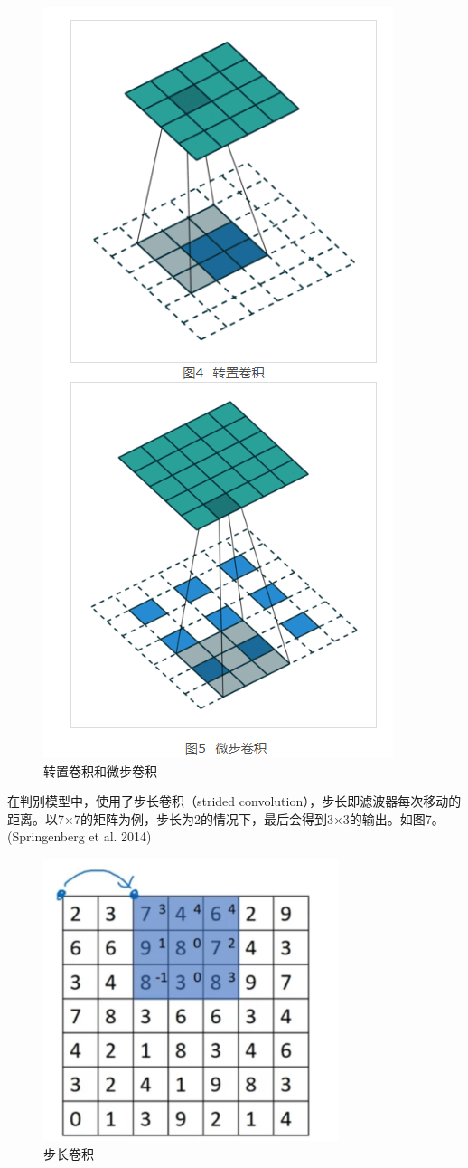 \documentclass[
  hyperref, a4paper]{ctexart}
\begin{document}
\begin{figure}
\centering
\includegraphics{./6.png}
\caption{转置卷积和微步卷积}
\end{figure}

在判别模型中，使用了步长卷积（strided
convolution），步长即滤波器每次移动的距离。以7×7的矩阵为例，步长为2的情况下，最后会得到3×3的输出。如图7。(Springenberg
et al. 2014)

\begin{figure}
\centering
\includegraphics{./7.png}
\caption{步长卷积}
\end{figure}
\end{document}
